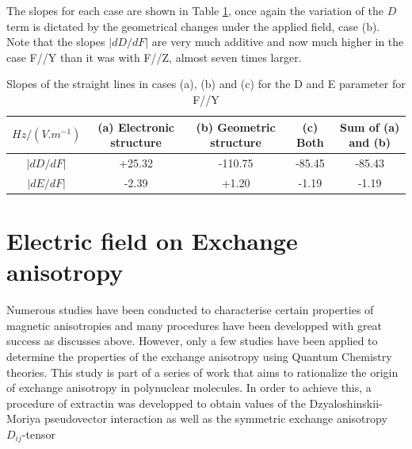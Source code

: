 \documentclass[10pt]{report}
\numberwithin{equation}{section}
\begin{document}
The slopes for each case are shown in Table \ref{tab:Slope_D_Y}, once again the variation of the $D$ term is dictated by the geometrical changes under the applied field, case (b).
Note that the slopes $|dD/dF|$ are very much additive and now much higher in the case F//Y than it was with F//Z, almost seven times larger.
\begin{table}[!h]
    \begin{tabular}{c | c c c c}
        \hline
        $Hz/(V.m^{-1})$ &  (a) Electronic structure & (b) Geometric structure & (c) Both & Sum of (a) and (b)\\
        \hline
        $|dD/dF|$ & +25.32	& -110.75 & 	-85.45 & 	-85.43\\
        $|dE/dF|$ &-2.39& 	+1.20& 	-1.19& 	-1.19\\
    \end{tabular}
    \caption{Slopes of the straight lines in cases (a), (b) and (c) for the D and E parameter for F//Y}
    \label{tab:Slope_D_Y}
\end{table}



\chapter{Electric field on Exchange anisotropy}\label{chap:Cu2Cl5}

Numerous studies have been conducted to characterise certain properties of magnetic anisotropies and many procedures have been developped with great success as discusses above. 
However, only a few studies have been applied to determine the properties of the exchange anisotropy using Quantum Chemistry theories.
This study is part of a series of work that aims to rationalize the origin of exchange anisotropy in polynuclear molecules.
In order to achieve this, a procedure of extractin was developped to obtain values of the Dzyaloshinskii-Moriya pseudovector interaction as well as the symmetric exchange anisotropy $D_{ij}$-tensor
\end{document}
